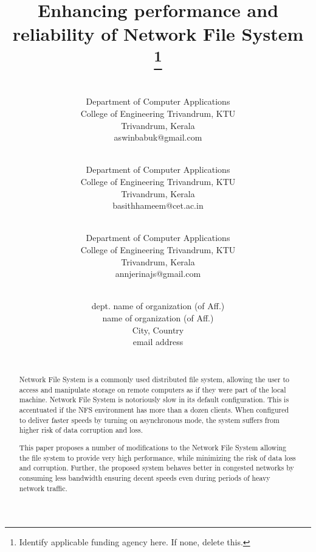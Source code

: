 \documentclass[conference]{IEEEtran}
\begin{document}
\title{Enhancing performance and reliability of Network File System\\
\thanks{Identify applicable funding agency here. If none, delete this.}
}

\author{
\\
Department of Computer Applications \\
College of Engineering Trivandrum, KTU\\
Trivandrum, Kerala \\
aswinbabuk@gmail.com\\
\and {}\\
Department of Computer Applications \\
College of Engineering Trivandrum, KTU\\
Trivandrum, Kerala \\
basithhameem@cet.ac.in\\
\and {}\\
Department of Computer Applications \\
College of Engineering Trivandrum, KTU\\
Trivandrum, Kerala  \\
annjerinajs@gmail.com\\
\and {}\\
dept. name of organization (of Aff.) \\
name of organization (of Aff.)\\
City, Country \\
email address\\
\\
}
\maketitle

\begin{abstract}
Network File System is a commonly used distributed file system, allowing the user to access and manipulate storage on remote computers as if they were part of the local machine. Network File System is notoriously slow in its default configuration. This is accentuated if the NFS environment has more than a dozen clients. When configured to deliver faster speeds by turning on asynchronous mode, the system suffers from higher risk of data corruption and loss.

This paper proposes a number of modifications to the Network File System allowing the file system to provide very high performance, while minimizing the risk of data loss and corruption. Further, the proposed system behaves better in congested networks by consuming less bandwidth ensuring decent speeds even during periods of heavy network traffic.
\end{abstract}
\end{document}
